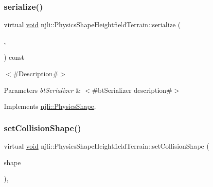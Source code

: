 \mbox{\label{classnjli_1_1_physics_shape_heightfield_terrain_a445d0515891fd81edc19049ee5a8c46f}} 
\subsubsection{\texorpdfstring{serialize()}{serialize()}}
{\footnotesize\ttfamily virtual \mbox{\hyperlink{_thread_8h_af1e856da2e658414cb2456cb6f7ebc66}{void}} njli\+::\+Physics\+Shape\+Heightfield\+Terrain\+::serialize (\begin{DoxyParamCaption}\item[{\mbox{\hyperlink{_thread_8h_af1e856da2e658414cb2456cb6f7ebc66}{void}} $\ast$}]{,  }\item[{bt\+Serializer $\ast$}]{ }\end{DoxyParamCaption}) const\hspace{0.3cm}{\ttfamily [virtual]}}

$<$\#\+Description\#$>$


\begin{DoxyParams}{Parameters}
{\em bt\+Serializer} & $<$\#bt\+Serializer description\#$>$ \\
\hline
\end{DoxyParams}


Implements \mbox{\hyperlink{classnjli_1_1_physics_shape_a2ac8a109a5ad67ee79f40ce8f28337cf}{njli\+::\+Physics\+Shape}}.

\mbox{\label{classnjli_1_1_physics_shape_heightfield_terrain_aba0df18d6c428c60f6efe61bb0fe1699}} 
\subsubsection{\texorpdfstring{set\+Collision\+Shape()}{setCollisionShape()}}
{\footnotesize\ttfamily virtual \mbox{\hyperlink{_thread_8h_af1e856da2e658414cb2456cb6f7ebc66}{void}} njli\+::\+Physics\+Shape\+Heightfield\+Terrain\+::set\+Collision\+Shape (\begin{DoxyParamCaption}\item[{const bt\+Collision\+Shape \&}]{shape }\end{DoxyParamCaption})\hspace{0.3cm}{\ttfamily [protected]}, {\ttfamily [virtual]}}



